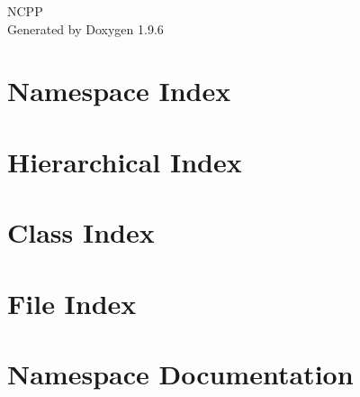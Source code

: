 \documentclass[twoside]{book}
\newcommand{\+}{\discretionary{\mbox{\scriptsize$\hookleftarrow$}}{}{}}
\newcommand{\clearemptydoublepage}{%
    \newpage{\pagestyle{empty}\cleardoublepage}%
  }
\begin{document}
  \raggedbottom
    \hypersetup{pageanchor=false,
                bookmarksnumbered=true,
                pdfencoding=unicode
               }
  \begin{titlepage}
  \vspace*{7cm}
  \begin{center}%
  {\Large NCPP}\\
  \vspace*{1cm}
  {\large Generated by Doxygen 1.9.6}\\
  \end{center}
  \end{titlepage}
  \clearemptydoublepage
  \tableofcontents
  \clearemptydoublepage
  \hypersetup{pageanchor=true}
\chapter{Namespace Index}

\chapter{Hierarchical Index}

\chapter{Class Index}

\chapter{File Index}

\chapter{Namespace Documentation}






\end{document}
